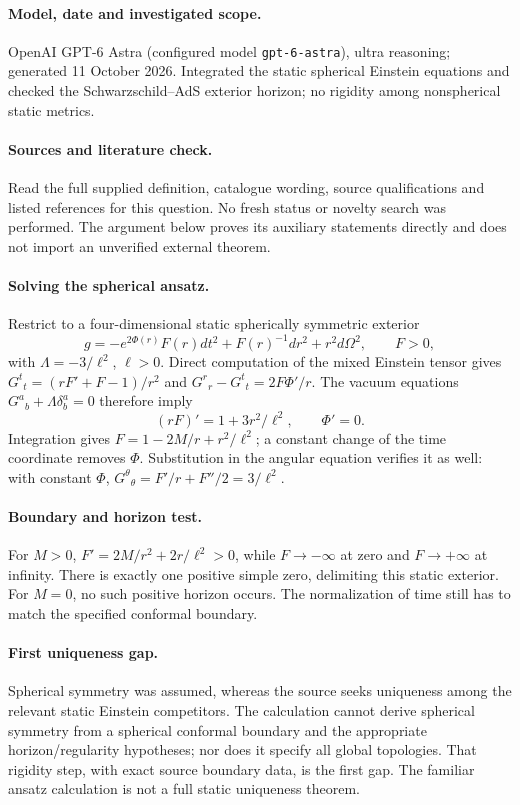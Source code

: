 \documentclass[11pt]{article}
\begin{document}
\paragraph{Model, date and investigated scope.}
OpenAI GPT-6 Astra (configured model \texttt{gpt-6-astra}), ultra reasoning; generated 11 October 2026. Integrated the static spherical Einstein equations and checked the Schwarzschild–AdS exterior horizon; no rigidity among nonspherical static metrics.

\paragraph{Sources and literature check.}
Read the full supplied definition, catalogue wording, source qualifications and listed references for this question. No fresh status or novelty search was performed. The argument below proves its auxiliary statements directly and does not import an unverified external theorem.

\paragraph{Solving the spherical ansatz.} Restrict to a four-dimensional static spherically symmetric exterior
\[
 g=-e^{2\Phi(r)}F(r)dt^2+F(r)^{-1}dr^2+r^2d\Omega^2,
 \qquad F>0,
\]
with \(\Lambda=-3/\ell^2\), \(\ell>0\). Direct computation of the mixed Einstein tensor gives \(G^t{}_t=(rF'+F-1)/r^2\) and \(G^r{}_r-G^t{}_t=2F\Phi'/r\). The vacuum equations \(G^a{}_b+\Lambda\delta^a_b=0\) therefore imply
\[
 (rF)'=1+3r^2/\ell^2,\qquad \Phi'=0.
\]
Integration gives \(F=1-2M/r+r^2/\ell^2\); a constant change of the time coordinate removes \(\Phi\). Substitution in the angular equation verifies it as well: with constant \(\Phi\), \(G^\theta{}_\theta=F'/r+F''/2=3/\ell^2\).
\paragraph{Boundary and horizon test.} For \(M>0\), \(F'=2M/r^2+2r/\ell^2>0\), while \(F\to-\infty\) at zero and \(F\to+\infty\) at infinity. There is exactly one positive simple zero, delimiting this static exterior. For \(M=0\), no such positive horizon occurs. The normalization of time still has to match the specified conformal boundary.
\paragraph{First uniqueness gap.} Spherical symmetry was assumed, whereas the source seeks uniqueness among the relevant static Einstein competitors. The calculation cannot derive spherical symmetry from a spherical conformal boundary and the appropriate horizon/regularity hypotheses; nor does it specify all global topologies. That rigidity step, with exact source boundary data, is the first gap. The familiar ansatz calculation is not a full static uniqueness theorem.
\end{document}
